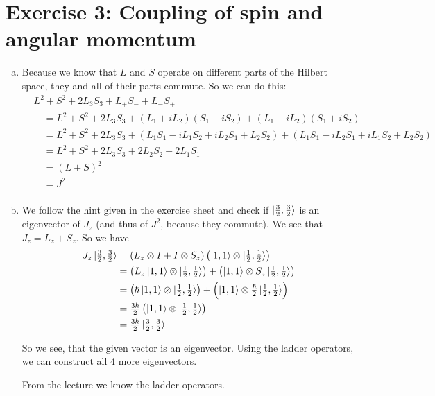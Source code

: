 \documentclass[a4paper,german,12pt,smallheadings]{scrartcl}
\begin{document}
\section*{Exercise 3: Coupling of spin and angular momentum}
\begin{enumerate}[a)]
  \item
    Because we know that $L$ and $S$ operate on different parts of the Hilbert
    space, they and all of their parts commute. So we can do this:
    \begin{align*}
      &L^2 + S^2 + 2 L_3 S_3 + L_+ S_- + L_- S_+ \\
      &\quad = L^2 + S^2 + 2 L_3 S_3 + (L_1+iL_2) (S_1-iS_2) + (L_1-iL_2)(S_1 + iS_2) \\
      &\quad = L^2 + S^2 + 2 L_3 S_3 + (L_1S_1 -iL_1S_2 +iL_2S_1 +L_2S_2) + (L_1S_1 - iL_2S_1 + iL_1S_2 + L_2S_2) \\
      &\quad = L^2 + S^2 + 2 L_3 S_3 + 2L_2S_2 + 2L_1S_1 \\
      &\quad = (L+S)^2 \\
      &\quad = J^2 \\
    \end{align*}
  \item
    We follow the hint given in the exercise sheet and check if
    $\ket{\frac{3}{2}, \frac{3}{2}}$ is an eigenvector of $J_z$ (and thus of $J^2$, because
    they commute). We see that $J_z = L_z + S_z$. So we have
    \begin{align*}
      J_z \ket{\tfrac{3}{2}, \tfrac{3}{2}} 
      &= (L_z \otimes I + I \otimes S_z) \del{\ket{1,1} \otimes \ket{\tfrac{1}{2}, \tfrac{1}{2}}} \\
      &= \del{L_z \ket{1,1} \otimes \ket{\tfrac{1}{2}, \tfrac{1}{2}}} + \del{\ket{1,1} \otimes S_z \ket{\tfrac{1}{2}, \tfrac{1}{2}}} \\
      &= \del{\hbar \ket{1,1} \otimes \ket{\tfrac{1}{2}, \tfrac{1}{2}}} + \del{\ket{1,1} \otimes \tfrac{\hbar}{2} \ket{\tfrac{1}{2}, \tfrac{1}{2}}} \\
      &= \tfrac{3\hbar}{2} \del{\ket{1,1} \otimes \ket{\tfrac{1}{2}, \tfrac{1}{2}}} \\
      &= \tfrac{3\hbar}{2} \ket{\tfrac{3}{2}, \tfrac{3}{2}}
    \end{align*}

    So we see, that the given vector is an eigenvector. Using the ladder
    operators, we can construct all 4 more eigenvectors.

    From the lecture we know the ladder operators.


\end{enumerate}
\end{document}

